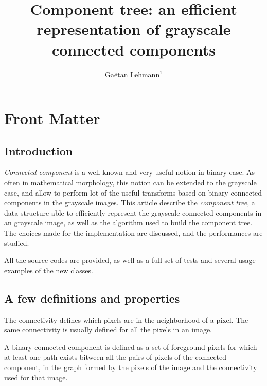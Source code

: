 \documentclass{InsightArticle}
\title{Component tree: an efficient representation of grayscale connected components}
\author{Ga\"etan Lehmann{$^1$}}
\begin{document}
\maketitle

\ifhtml
\chapter*{Front Matter\label{front}}
\fi


\begin{abstract}
\noindent
\end{abstract}

\tableofcontents

\section{Introduction}

{\em Connected component} is a well known and very useful notion in binary case.
As often in mathematical morphology, this notion can be extended to the grayscale case,
and allow to perform lot of the useful transforms based on binary connected components
in the grayscale images.
This article describe the {\em component tree}, a data structure able to efficiently represent
the grayscale connected components in an grayscale image, as well as the algorithm
used to build the component tree.
The choices made for the implementation are discussed, and the performances are studied.

All the source codes are provided, as well as a full set of tests and several
usage examples of the new classes.

\section{A few definitions and properties}

The connectivity defines which pixels are in the neighborhood of a pixel. The same connectivity is usually defined for all the pixels in an image.

A binary connected component is defined as a set of foreground pixels for which at least one path
exists bitween all the pairs of pixels of the connected component, in the graph formed by
the pixels of the image and the connectivity used for that image.
\end{document}
